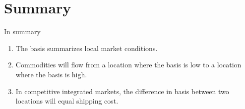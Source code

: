 \documentclass[table,xcolor=pdftex,dvipsnames]{beamer}\usepackage[]{graphicx}\usepackage[]{color}
\begin{document}
\section{Summary}

\begin{frame}{In summary}
\begin{enumerate}[label=\textbullet]
    \item The basis summarizes local market conditions.
    \item Commodities will flow from a location where the basis is low to a location where the basis is high.
    \item In competitive integrated markets, the difference in basis between two locations will equal shipping cost.
\end{enumerate}
\end{frame}


%


\end{document}
